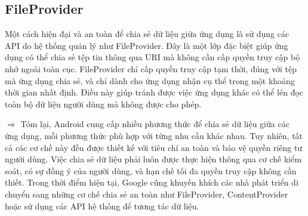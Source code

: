 \subsection{FileProvider}
\renewcommand{\labelitemi}{--}    
    \begin{flushleft}
        \hspace*{0.8cm}Một cách hiện đại và an toàn để chia sẻ dữ liệu giữa ứng dụng là sử dụng các API do hệ thống quản lý như FileProvider. Đây là một lớp đặc biệt giúp ứng dụng có thể chia sẻ tệp tin thông qua URI mà không cần cấp quyền truy cập bộ nhớ ngoài toàn cục. FileProvider chỉ cấp quyền truy cập tạm thời, đúng với tệp mà ứng dụng chia sẻ, và chỉ dành cho ứng dụng nhận cụ thể trong một khoảng thời gian nhất định. Điều này giúp tránh được việc ứng dụng khác có thể lén đọc toàn bộ dữ liệu người dùng mà không được cho phép.
    \end{flushleft}
    \begin{flushleft}
      \hspace*{0.8cm}$\Rightarrow$ Tóm lại, Android cung cấp nhiều phương thức để chia sẻ dữ liệu giữa các ứng dụng, mỗi phương thức phù hợp với từng nhu cầu khác nhau. Tuy nhiên, tất cả các cơ chế này đều được thiết kế với tiêu chí an toàn và bảo vệ quyền riêng tư người dùng. Việc chia sẻ dữ liệu phải luôn được thực hiện thông qua cơ chế kiểm soát, có sự đồng ý của người dùng, và hạn chế tối đa quyền truy cập không cần thiết. Trong thời điểm hiện tại, Google cũng khuyến khích các nhà phát triển di chuyển sang những cơ chế chia sẻ an toàn như FileProvider, ContentProvider hoặc sử dụng các API hệ thống để tương tác dữ liệu.
    \end{flushleft}
\newpage
